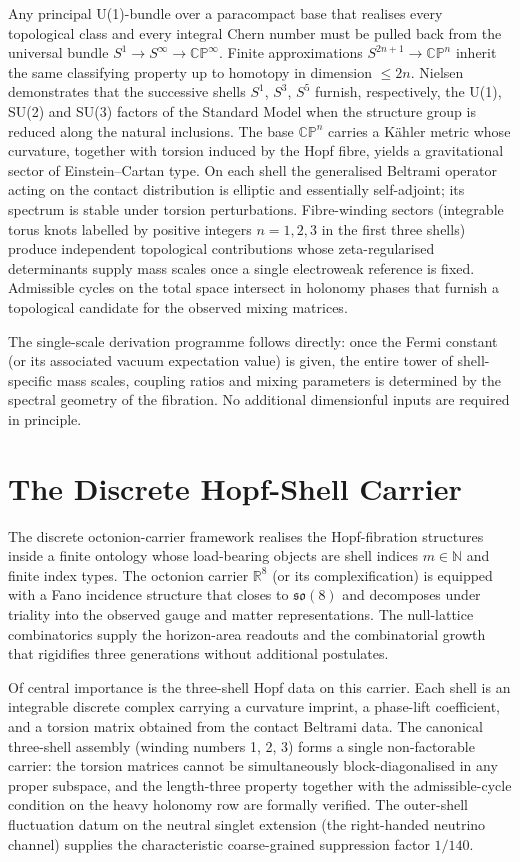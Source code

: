 \documentclass[11pt]{amsart}
\begin{document}
Any principal U(1)-bundle over a paracompact base that realises every topological class and every integral Chern number must be pulled back from the universal bundle $S^1\to S^\infty\to\mathbb{CP}^\infty$. Finite approximations $S^{2n+1}\to\mathbb{CP}^n$ inherit the same classifying property up to homotopy in dimension $\le 2n$. Nielsen demonstrates that the successive shells $S^1$, $S^3$, $S^5$ furnish, respectively, the U(1), SU(2) and SU(3) factors of the Standard Model when the structure group is reduced along the natural inclusions. The base $\mathbb{CP}^n$ carries a Kähler metric whose curvature, together with torsion induced by the Hopf fibre, yields a gravitational sector of Einstein--Cartan type. On each shell the generalised Beltrami operator acting on the contact distribution is elliptic and essentially self-adjoint; its spectrum is stable under torsion perturbations. Fibre-winding sectors (integrable torus knots labelled by positive integers $n=1,2,3$ in the first three shells) produce independent topological contributions whose zeta-regularised determinants supply mass scales once a single electroweak reference is fixed. Admissible cycles on the total space intersect in holonomy phases that furnish a topological candidate for the observed mixing matrices.

The single-scale derivation programme follows directly: once the Fermi constant (or its associated vacuum expectation value) is given, the entire tower of shell-specific mass scales, coupling ratios and mixing parameters is determined by the spectral geometry of the fibration. No additional dimensionful inputs are required in principle.

\section{The Discrete Hopf-Shell Carrier}

The discrete octonion-carrier framework realises the Hopf-fibration structures inside a finite ontology whose load-bearing objects are shell indices $m\in\mathbb{N}$ and finite index types. The octonion carrier $\mathbb{R}^8$ (or its complexification) is equipped with a Fano incidence structure that closes to $\mathfrak{so}(8)$ and decomposes under triality into the observed gauge and matter representations. The null-lattice combinatorics supply the horizon-area readouts and the combinatorial growth that rigidifies three generations without additional postulates.

Of central importance is the three-shell Hopf data on this carrier. Each shell is an integrable discrete complex carrying a curvature imprint, a phase-lift coefficient, and a torsion matrix obtained from the contact Beltrami data. The canonical three-shell assembly (winding numbers 1, 2, 3) forms a single non-factorable carrier: the torsion matrices cannot be simultaneously block-diagonalised in any proper subspace, and the length-three property together with the admissible-cycle condition on the heavy holonomy row are formally verified. The outer-shell fluctuation datum on the neutral singlet extension (the right-handed neutrino channel) supplies the characteristic coarse-grained suppression factor $1/140$.
\end{document}
